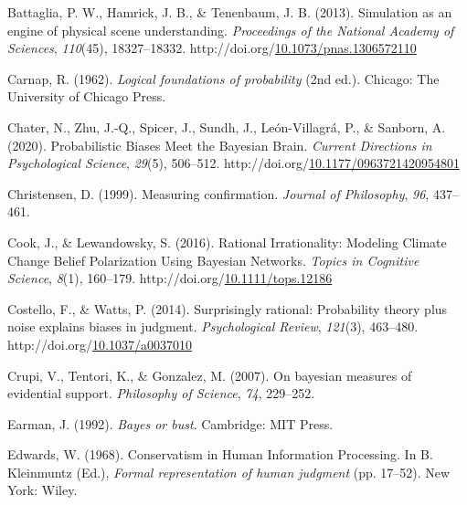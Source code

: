 \documentclass[10pt, letterpaper]{article}
\newenvironment{CSLReferences}%
  {}%
  {\par}
\begin{document}
\hypertarget{refs}{}
\begin{CSLReferences}{1}{0}
\leavevmode{}%
Battaglia, P. W., Hamrick, J. B., \& Tenenbaum, J. B. (2013). Simulation
as an engine of physical scene understanding. \emph{Proceedings of the
National Academy of Sciences}, \emph{110}(45), 18327--18332.
http://doi.org/\href{https://doi.org/10.1073/pnas.1306572110}{10.1073/pnas.1306572110}

\leavevmode{}%
Carnap, R. (1962). \emph{Logical foundations of probability} (2nd ed.).
Chicago: The University of Chicago Press.

\leavevmode{}%
Chater, N., Zhu, J.-Q., Spicer, J., Sundh, J., León-Villagrá, P., \&
Sanborn, A. (2020). Probabilistic {Biases} {Meet} the {Bayesian}
{Brain}. \emph{Current Directions in Psychological Science},
\emph{29}(5), 506--512.
http://doi.org/\href{https://doi.org/10.1177/0963721420954801}{10.1177/0963721420954801}

\leavevmode{}%
Christensen, D. (1999). Measuring confirmation. \emph{Journal of
Philosophy}, \emph{96}, 437--461.

\leavevmode{}%
Cook, J., \& Lewandowsky, S. (2016). Rational {Irrationality}:
{Modeling} {Climate} {Change} {Belief} {Polarization} {Using} {Bayesian}
{Networks}. \emph{Topics in Cognitive Science}, \emph{8}(1), 160--179.
http://doi.org/\href{https://doi.org/10.1111/tops.12186}{10.1111/tops.12186}

\leavevmode{}%
Costello, F., \& Watts, P. (2014). Surprisingly rational: {Probability}
theory plus noise explains biases in judgment. \emph{Psychological
Review}, \emph{121}(3), 463--480.
http://doi.org/\href{https://doi.org/10.1037/a0037010}{10.1037/a0037010}

\leavevmode{}%
Crupi, V., Tentori, K., \& Gonzalez, M. (2007). On bayesian measures of
evidential support. \emph{Philosophy of Science}, \emph{74}, 229--252.

\leavevmode{}%
Earman, J. (1992). \emph{Bayes or bust}. Cambridge: MIT Press.

\leavevmode{}%
Edwards, W. (1968). Conservatism in {Human} {Information} {Processing}.
In B. Kleinmuntz (Ed.), \emph{Formal representation of human judgment}
(pp. 17--52). New York: Wiley.


\end{CSLReferences}
\end{document}
